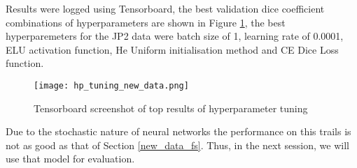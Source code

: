 Results were logged using Tensorboard, the best validation dice coefficient combinations of hyperparameters are shown in Figure \ref{tensorboard}, the best hyperparemeters for the JP2 data were batch size of 1, learning rate of 0.0001, ELU activation function, He Uniform initialisation method and CE Dice Loss function.

\begin{figure}[hbt!]
    \centering
    \texttt{[image: hp\_tuning\_new\_data.png]}
    \caption{Tensorboard screenshot of top results of hyperparameter tuning}
    \label{tensorboard}
\end{figure}

Due to the stochastic nature of neural networks the performance on this trails is not as good as that of Section \ref{new_data_fs}. Thus, in the next session, we will use that model for evaluation.
